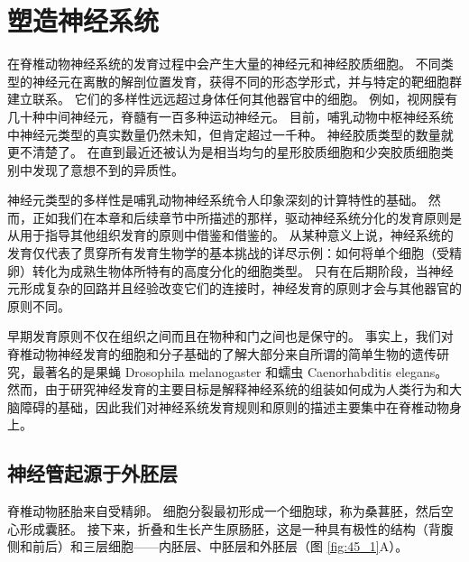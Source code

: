 \chapter{塑造神经系统} \label{chap:chap45}

在脊椎动物神经系统的发育过程中会产生大量的神经元和神经胶质细胞。
不同类型的神经元在离散的解剖位置发育，获得不同的形态学形式，并与特定的靶细胞群建立联系。
它们的多样性远远超过身体任何其他器官中的细胞。
例如，视网膜有几十种中间神经元，脊髓有一百多种运动神经元。
目前，哺乳动物中枢神经系统中神经元类型的真实数量仍然未知，但肯定超过一千种。
神经胶质类型的数量就更不清楚了。
在直到最近还被认为是相当均匀的星形胶质细胞和少突胶质细胞类别中发现了意想不到的异质性。


神经元类型的多样性是哺乳动物神经系统令人印象深刻的计算特性的基础。
然而，正如我们在本章和后续章节中所描述的那样，驱动神经系统分化的发育原则是从用于指导其他组织发育的原则中借鉴和借鉴的。
从某种意义上说，神经系统的发育仅代表了贯穿所有发育生物学的基本挑战的详尽示例：如何将单个细胞（受精卵）转化为成熟生物体所特有的高度分化的细胞类型。
只有在后期阶段，当神经元形成复杂的回路并且经验改变它们的连接时，神经发育的原则才会与其他器官的原则不同。


早期发育原则不仅在组织之间而且在物种和门之间也是保守的。
事实上，我们对脊椎动物神经发育的细胞和分子基础的了解大部分来自所谓的简单生物的遗传研究，最著名的是果蝇 Drosophila melanogaster 和蠕虫 Caenorhabditis elegans。
然而，由于研究神经发育的主要目标是解释神经系统的组装如何成为人类行为和大脑障碍的基础，因此我们对神经系统发育规则和原则的描述主要集中在脊椎动物身上。



\section{神经管起源于外胚层}

脊椎动物胚胎来自受精卵。
细胞分裂最初形成一个细胞球，称为桑葚胚，然后空心形成囊胚。
接下来，折叠和生长产生原肠胚，这是一种具有极性的结构（背腹侧和前后）和三层细胞——内胚层、中胚层和外胚层（图 \ref{fig:45_1}A）。


